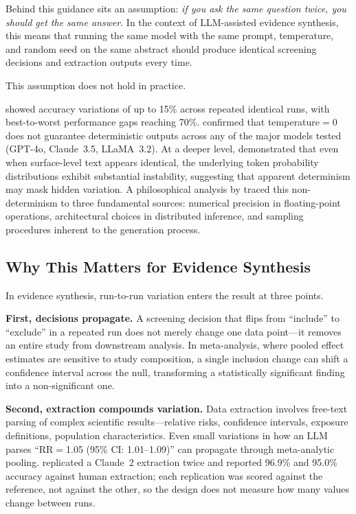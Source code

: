 \documentclass[preprint,review,12pt,authoryear]{elsarticle}
\begin{document}
Behind this guidance sits an assumption: \emph{if you ask the same question twice, you should get the same answer}.
In the context of LLM-assisted evidence synthesis, this means that running the same model with the same prompt, temperature, and random seed on the same abstract should produce identical screening decisions and extraction outputs every time.

This assumption does not hold in practice.

\citet{atil2024nondeterminism} showed accuracy variations of up to 15\% across repeated identical runs, with best-to-worst performance gaps reaching 70\%.
\citet{klishevich2025codereview} confirmed that temperature${=}$0 does not guarantee deterministic outputs across any of the major models tested (GPT-4o, Claude~3.5, LLaMA~3.2).
At a deeper level, \citet{fu2026beyond} demonstrated that even when surface-level text appears identical, the underlying token probability distributions exhibit substantial instability, suggesting that apparent determinism may mask hidden variation.
A philosophical analysis by \citet{karelin2024indeterminism} traced this non-determinism to three fundamental sources: numerical precision in floating-point operations, architectural choices in distributed inference, and sampling procedures inherent to the generation process.

\subsection{Why This Matters for Evidence Synthesis}

In evidence synthesis, run-to-run variation enters the result at three points.

\textbf{First, decisions propagate.}
A screening decision that flips from ``include'' to ``exclude'' in a repeated run does not merely change one data point---it removes an entire study from downstream analysis.
In meta-analysis, where pooled effect estimates are sensitive to study composition, a single inclusion change can shift a confidence interval across the null, transforming a statistically significant finding into a non-significant one.

\textbf{Second, extraction compounds variation.}
Data extraction involves free-text parsing of complex scientific results---relative risks, confidence intervals, exposure definitions, population characteristics.
Even small variations in how an LLM parses ``RR${=}$1.05 (95\% CI: 1.01--1.09)'' can propagate through meta-analytic pooling.
\citet{gartlehner2024extraction} replicated a Claude~2 extraction twice and reported 96.9\% and 95.0\% accuracy against human extraction; each replication was scored against the reference, not against the other, so the design does not measure how many values change between runs.
\end{document}
